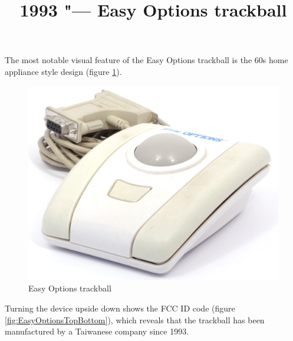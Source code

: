 \documentclass[11pt, a4paper]{article}
\begin{document}
\title{1993 "--- Easy Options trackball}
\date{}
\maketitle
{}
The most notable visual feature of the Easy Options trackball is the 60s home appliance style design (figure \ref{fig:EasyOptionsPic}).

\begin{figure}[h]
    \centering
    \includegraphics[scale=0.7]{1993_easy_options_trackball/pic_60.jpg}
    \caption{Easy Options trackball}
    \label{fig:EasyOptionsPic}
\end{figure}

Turning the device upside down shows the FCC ID code (figure \ref{fig:EasyOptionsTopBottom}), which reveals that the trackball has been manufactured by a Taiwanese company since 1993.
\end{document}
